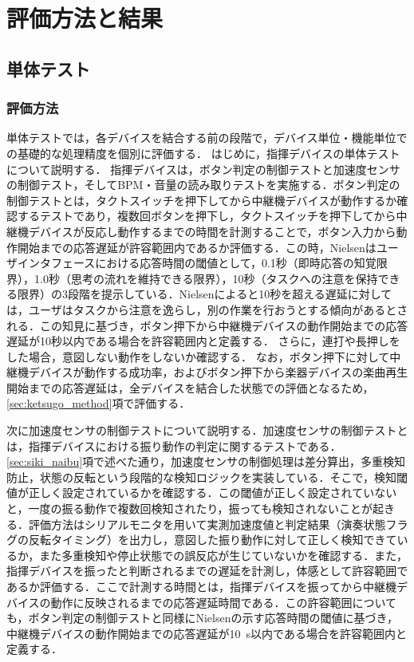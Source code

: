 \section{評価方法と結果}
\label{sec:hyouka}


\subsection{単体テスト}
\subsubsection{評価方法}
\label{sec:tanka_method}

単体テストでは，各デバイスを結合する前の段階で，デバイス単位・機能単位での基礎的な処理精度を個別に評価する．
はじめに，指揮デバイスの単体テストについて説明する．
指揮デバイスは，ボタン判定の制御テストと加速度センサの制御テスト，そしてBPM・音量の読み取りテストを実施する．ボタン判定の制御テストとは，タクトスイッチを押下してから中継機デバイスが動作するか確認するテストであり，複数回ボタンを押下し，タクトスイッチを押下してから中継機デバイスが反応し動作するまでの時間を計測することで，ボタン入力から動作開始までの応答遅延が許容範囲内であるか評価する．この時，Nielsenはユーザインタフェースにおける応答時間の閾値として，0.1秒（即時応答の知覚限界），1.0秒（思考の流れを維持できる限界），10秒（タスクへの注意を保持できる限界）の3段階を提示している\cite{nielsen1993}．Nielsenによると10秒を超える遅延に対しては，ユーザはタスクから注意を逸らし，別の作業を行おうとする傾向があるとされる．この知見に基づき，ボタン押下から中継機デバイスの動作開始までの応答遅延が10秒以内である場合を許容範囲内と定義する．
さらに，連打や長押しをした場合，意図しない動作をしないか確認する．
なお，ボタン押下に対して中継機デバイスが動作する成功率，およびボタン押下から楽器デバイスの楽曲再生開始までの応答遅延は，全デバイスを結合した状態での評価となるため，\ref{sec:ketsugo_method}項で評価する．

次に加速度センサの制御テストについて説明する．加速度センサの制御テストとは，指揮デバイスにおける振り動作の判定に関するテストである．\ref{sec:siki_naibu}項で述べた通り，加速度センサの制御処理は差分算出，多重検知防止，状態の反転という段階的な検知ロジックを実装している．そこで，検知閾値が正しく設定されているかを確認する．この閾値が正しく設定されていないと，一度の振る動作で複数回検知されたり，振っても検知されないことが起きる．評価方法はシリアルモニタを用いて実測加速度値と判定結果（演奏状態フラグの反転タイミング）を出力し，意図した振り動作に対して正しく検知できているか，また多重検知や停止状態での誤反応が生じていないかを確認する．また，指揮デバイスを振ったと判断されるまでの遅延を計測し，体感として許容範囲であるか評価する．ここで計測する時間とは，指揮デバイスを振ってから中継機デバイスの動作に反映されるまでの応答遅延時間である．この許容範囲についても，ボタン判定の制御テストと同様にNielsenの示す応答時間の閾値\cite{nielsen1993}に基づき，中継機デバイスの動作開始までの応答遅延が\SI{10}{s}以内である場合を許容範囲内と定義する．


